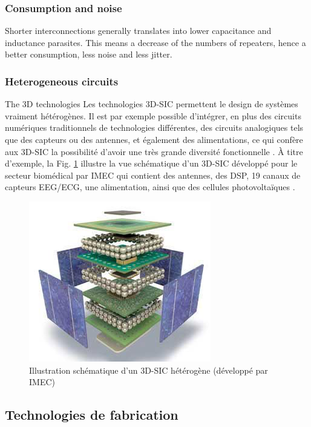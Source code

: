 \subsubsection*{Consumption and noise}

Shorter interconnections generally translates into lower capacitance and inductance parasites. This means a decrease of the numbers of repeaters, hence a better consumption, less noise and less jitter.

\subsubsection*{Heterogeneous circuits}

The 3D technologies 
Les technologies 3D-SIC permettent le design de systèmes vraiment hétérogènes. Il est par exemple possible d'intégrer, en plus des circuits numériques traditionnels de technologies différentes, des circuits analogiques tels que des capteurs ou des antennes, et également des alimentations, ce qui confère aux 3D-SIC la possibilité d'avoir une très grande diversité fonctionnelle \cite{4299568}. À titre d'exemple, la Fig. \ref{fig:heterogeneity} illustre la vue schématique d'un 3D-SIC développé pour le secteur biomédical par IMEC qui contient des antennes, des DSP, 19 canaux de capteurs EEG/ECG, une alimentation, ainsi que des cellules photovoltaïques \cite{4198870}.

\begin{figure}[h!]
\begin{center}
\includegraphics[width=0.5\linewidth]{heterogeneity.png}
\end{center}
\vspace{-0.5cm}
\caption{Illustration schématique d'un 3D-SIC hétérogène (développé par IMEC) \cite{4198870}}
\label{fig:heterogeneity}
\end{figure}

\subsection{Technologies de fabrication}


